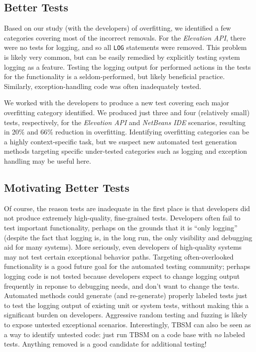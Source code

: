 \subsection{Better Tests} 
Based on our study (with the developers) of overfitting, we identified a few categories covering most of the incorrect removals. For the \textit{Elevation API}, there were no tests for logging, and so all {\tt LOG} statements were removed. This problem is likely very common, but can be easily remedied by explicitly testing system logging as a feature.  Testing the logging output for performed actions in the tests for the functionality is a seldom-performed, but likely beneficial practice.  Similarly, exception-handling code was often inadequately tested.

We worked with the developers to produce a new test covering each major overfitting category identified. We produced just three and four (relatively small) tests, respectively, for the \textit{Elevation API} and \textit{NetBeans IDE} scenarios, resulting in 20\% and 66\% reduction in overfitting. Identifying overfitting categories can be a highly context-specific task, but we suspect new automated test generation methods targeting specific under-tested categories such as logging and exception handling may be useful here.

\subsection{Motivating Better Tests}

Of course, the reason tests are inadequate in the first place is that developers did not produce extremely high-quality, fine-grained tests.  Developers often fail to test important functionality, perhaps on the grounds that it is ``only logging'' (despite the fact that logging is, in the long run, the only visibility and debugging aid for many systems).  More seriously, even developers of high-quality systems may not test certain exceptional behavior paths.  Targeting often-overlooked functionality is a good future goal for the automated testing community; perhaps logging code is not tested because developers expect to change logging output frequently in reponse to debugging needs, and don't want to change the tests.  Automated methods could generate (and re-generate) properly labeled tests just to test the logging output of existing unit or system tests, without making this a significant burden on developers.  Aggressive random testing and fuzzing is likely to expose untested exceptional scenarios.  Interestingly, TBSM can also be seen as a way to identify untested code:  just run TBSM on a code base with \emph{no} labeled tests.  Anything removed is a good candidate for additional testing!


